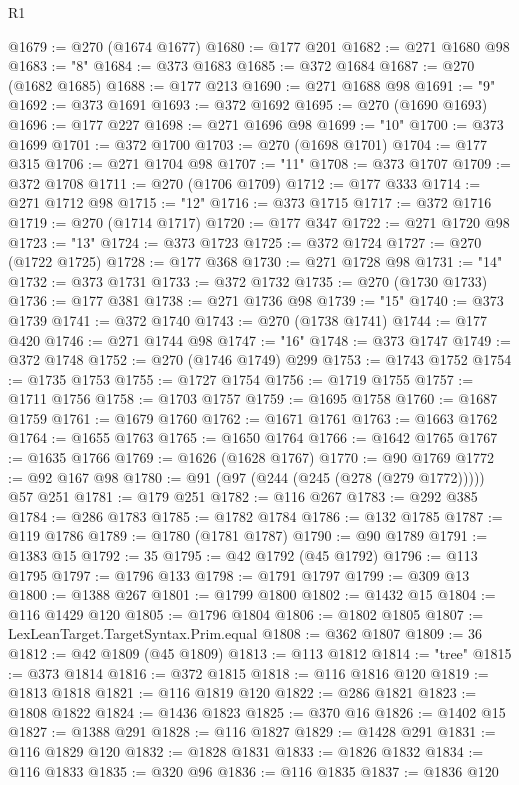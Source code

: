 \begin{lexlean}{R1}
\begin{coremodule}
@1679 := @270 (@1674 @1677)
@1680 := @177 @201
@1682 := @271 @1680 @98
@1683 := "8"
@1684 := @373 @1683
@1685 := @372 @1684
@1687 := @270 (@1682 @1685)
@1688 := @177 @213
@1690 := @271 @1688 @98
@1691 := "9"
@1692 := @373 @1691
@1693 := @372 @1692
@1695 := @270 (@1690 @1693)
@1696 := @177 @227
@1698 := @271 @1696 @98
@1699 := "10"
@1700 := @373 @1699
@1701 := @372 @1700
@1703 := @270 (@1698 @1701)
@1704 := @177 @315
@1706 := @271 @1704 @98
@1707 := "11"
@1708 := @373 @1707
@1709 := @372 @1708
@1711 := @270 (@1706 @1709)
@1712 := @177 @333
@1714 := @271 @1712 @98
@1715 := "12"
@1716 := @373 @1715
@1717 := @372 @1716
@1719 := @270 (@1714 @1717)
@1720 := @177 @347
@1722 := @271 @1720 @98
@1723 := "13"
@1724 := @373 @1723
@1725 := @372 @1724
@1727 := @270 (@1722 @1725)
@1728 := @177 @368
@1730 := @271 @1728 @98
@1731 := "14"
@1732 := @373 @1731
@1733 := @372 @1732
@1735 := @270 (@1730 @1733)
@1736 := @177 @381
@1738 := @271 @1736 @98
@1739 := "15"
@1740 := @373 @1739
@1741 := @372 @1740
@1743 := @270 (@1738 @1741)
@1744 := @177 @420
@1746 := @271 @1744 @98
@1747 := "16"
@1748 := @373 @1747
@1749 := @372 @1748
@1752 := @270 (@1746 @1749) @299
@1753 := @1743 @1752
@1754 := @1735 @1753
@1755 := @1727 @1754
@1756 := @1719 @1755
@1757 := @1711 @1756
@1758 := @1703 @1757
@1759 := @1695 @1758
@1760 := @1687 @1759
@1761 := @1679 @1760
@1762 := @1671 @1761
@1763 := @1663 @1762
@1764 := @1655 @1763
@1765 := @1650 @1764
@1766 := @1642 @1765
@1767 := @1635 @1766
@1769 := @1626 (@1628 @1767)
@1770 := @90 @1769
@1772 := @92 @167 @98
@1780 := @91 (@97 (@244 (@245 (@278 (@279 @1772))))) @57 @251
@1781 := @179 @251
@1782 := @116 @267
@1783 := @292 @385
@1784 := @286 @1783
@1785 := @1782 @1784
@1786 := @132 @1785
@1787 := @119 @1786
@1789 := @1780 (@1781 @1787)
@1790 := @90 @1789
@1791 := @1383 @15
@1792 := 35
@1795 := @42 @1792 (@45 @1792)
@1796 := @113 @1795
@1797 := @1796 @133
@1798 := @1791 @1797
@1799 := @309 @13
@1800 := @1388 @267
@1801 := @1799 @1800
@1802 := @1432 @15
@1804 := @116 @1429 @120
@1805 := @1796 @1804
@1806 := @1802 @1805
@1807 := LexLeanTarget.TargetSyntax.Prim.equal
@1808 := @362 @1807
@1809 := 36
@1812 := @42 @1809 (@45 @1809)
@1813 := @113 @1812
@1814 := "tree"
@1815 := @373 @1814
@1816 := @372 @1815
@1818 := @116 @1816 @120
@1819 := @1813 @1818
@1821 := @116 @1819 @120
@1822 := @286 @1821
@1823 := @1808 @1822
@1824 := @1436 @1823
@1825 := @370 @16
@1826 := @1402 @15
@1827 := @1388 @291
@1828 := @116 @1827
@1829 := @1428 @291
@1831 := @116 @1829 @120
@1832 := @1828 @1831
@1833 := @1826 @1832
@1834 := @116 @1833
@1835 := @320 @96
@1836 := @116 @1835
@1837 := @1836 @120

\end{coremodule}
\end{lexlean}
